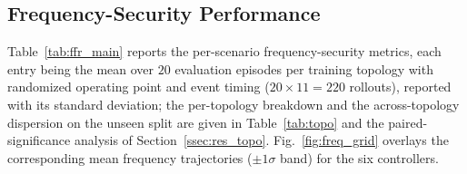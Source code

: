 \documentclass[lettersize,journal]{IEEEtran}
\begin{document}
\subsection{Frequency-Security Performance}
\label{ssec:res_stability}
 
Table~\ref{tab:ffr_main} reports the per-scenario frequency-security metrics, each entry being the mean over $20$ evaluation episodes per training topology with randomized operating point and event timing ($20\times 11=220$ rollouts), reported with its standard deviation; the per-topology breakdown and the across-topology dispersion on the unseen split are given in Table~\ref{tab:topo} and the paired-significance analysis of Section~\ref{ssec:res_topo}. Fig.~\ref{fig:freq_grid} overlays the corresponding mean frequency trajectories ($\pm 1\sigma$ band) for the six controllers.
 
\end{document}

